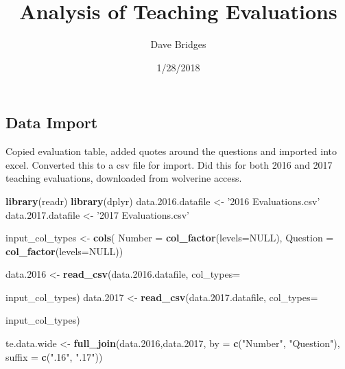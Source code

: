 \documentclass[]{article}
\title{Analysis of Teaching Evaluations}
\author{Dave Bridges}
\date{1/28/2018}
\newenvironment{Shaded}{\begin{snugshade}}{\end{snugshade}}
\newcommand{\KeywordTok}[1]{\textcolor[rgb]{0.13,0.29,0.53}{\textbf{{#1}}}}
\newcommand{\DataTypeTok}[1]{\textcolor[rgb]{0.13,0.29,0.53}{{#1}}}
\newcommand{\FloatTok}[1]{\textcolor[rgb]{0.00,0.00,0.81}{{#1}}}
\newcommand{\StringTok}[1]{\textcolor[rgb]{0.31,0.60,0.02}{{#1}}}
\newcommand{\OtherTok}[1]{\textcolor[rgb]{0.56,0.35,0.01}{{#1}}}
\newcommand{\NormalTok}[1]{{#1}}
\begin{document}
\maketitle

{
\setcounter{tocdepth}{2}
\tableofcontents
}
\subsection{Data Import}\label{data-import}

Copied evaluation table, added quotes around the questions and imported
into excel. Converted this to a csv file for import. Did this for both
2016 and 2017 teaching evaluations, downloaded from wolverine access.

\begin{Shaded}
\begin{Highlighting}[]
\KeywordTok{library}\NormalTok{(readr)}
\KeywordTok{library}\NormalTok{(dplyr)}
\NormalTok{data}\FloatTok{.2016}\NormalTok{.datafile <-}\StringTok{ '2016 Evaluations.csv'}
\NormalTok{data}\FloatTok{.2017}\NormalTok{.datafile <-}\StringTok{ '2017 Evaluations.csv'}

\NormalTok{input_col_types <-}\StringTok{ }\KeywordTok{cols}\NormalTok{(}
  \DataTypeTok{Number =} \KeywordTok{col_factor}\NormalTok{(}\DataTypeTok{levels=}\OtherTok{NULL}\NormalTok{),}
  \DataTypeTok{Question =} \KeywordTok{col_factor}\NormalTok{(}\DataTypeTok{levels=}\OtherTok{NULL}\NormalTok{))}

\NormalTok{data}\FloatTok{.2016} \NormalTok{<-}\StringTok{ }\KeywordTok{read_csv}\NormalTok{(data}\FloatTok{.2016}\NormalTok{.datafile, }\DataTypeTok{col_types=}\NormalTok{input_col_types) %
\NormalTok{data}\FloatTok{.2017} \NormalTok{<-}\StringTok{ }\KeywordTok{read_csv}\NormalTok{(data}\FloatTok{.2017}\NormalTok{.datafile, }\DataTypeTok{col_types=}\NormalTok{input_col_types)  %

\NormalTok{te.data.wide <-}\StringTok{ }\KeywordTok{full_join}\NormalTok{(data}\FloatTok{.2016}\NormalTok{,data}\FloatTok{.2017}\NormalTok{, }
                     \DataTypeTok{by =} \KeywordTok{c}\NormalTok{(}\StringTok{"Number"}\NormalTok{, }\StringTok{"Question"}\NormalTok{), }
                     \DataTypeTok{suffix =} \KeywordTok{c}\NormalTok{(}\StringTok{".16"}\NormalTok{, }\StringTok{".17"}\NormalTok{))}

}}
\end{Highlighting}
\end{Shaded}
\end{document}
